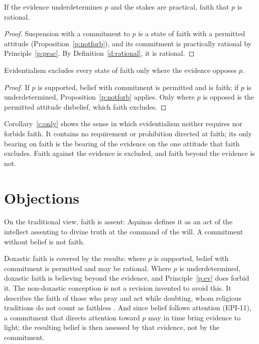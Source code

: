 \documentclass{situationist-preprint}
\begin{document}
\begin{theorem}\label{t:main}
If the evidence underdetermines $p$ and the stakes are practical, faith that $p$ is rational.
\end{theorem}

\begin{proof}
Suspension with a commitment to $p$ is a state of faith with a permitted attitude (Proposition~\ref{p:notforb}), and its commitment is practically rational by Principle~\ref{p:prac}. By Definition~\ref{d:rational}, it is rational.
\end{proof}

\begin{corollary}\label{c:only}
Evidentialism excludes every state of faith only where the evidence opposes $p$.
\end{corollary}

\begin{proof}
If $p$ is supported, belief with commitment is permitted and is faith; if $p$ is underdetermined, Proposition~\ref{p:notforb} applies. Only where $p$ is opposed is the permitted attitude disbelief, which faith excludes.
\end{proof}

Corollary~\ref{c:only} shows the sense in which evidentialism neither requires nor forbids faith. It contains no requirement or prohibition directed at faith; its only bearing on faith is the bearing of the evidence on the one attitude that faith excludes. Faith against the evidence is excluded, and faith beyond the evidence is not.

\section{Objections}

\begin{objection}
On the traditional view, faith is assent: Aquinas defines it as an act of the intellect assenting to divine truth at the command of the will. A commitment without belief is not faith.
\end{objection}

\begin{reply}
Doxastic faith is covered by the results: where $p$ is supported, belief with commitment is permitted and may be rational. Where $p$ is underdetermined, doxastic faith is believing beyond the evidence, and Principle~\ref{p:ev} does forbid it. The non-doxastic conception is not a revision invented to avoid this. It describes the faith of those who pray and act while doubting, whom religious traditions do not count as faithless \citep{HowardSnyder2013}. And since belief follows attention (EPI-11), a commitment that directs attention toward $p$ may in time bring evidence to light; the resulting belief is then assessed by that evidence, not by the commitment.
\end{reply}
\end{document}
